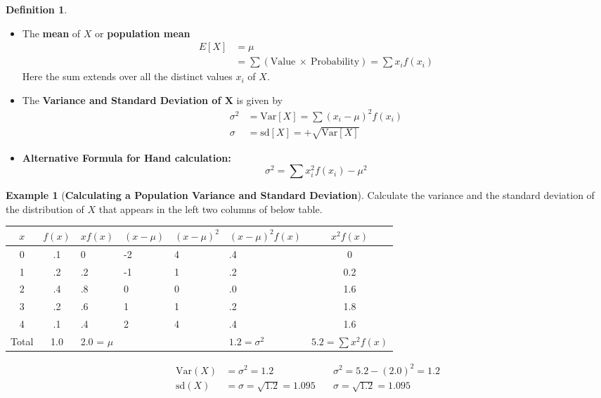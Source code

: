 \documentclass[12pt,openany]{book}
\theoremstyle{definition}
\newtheorem{definition}{Definition}[chapter]
\newtheorem{example}{Example}[chapter]
\newcommand{\Var}{\text{Var}}
\newcommand{\sd}{\text{sd}}
\begin{document}
	\vspace{10pt}
	\begin{tcolorbox}[colback=white,colframe=defcolor,arc=5pt,title={\color{white}\bf Expectation(Mean) and Standard Deviation of a Probability Distribution}]
		\begin{definition}
			\ \begin{itemize}
				\item The \textbf{mean} of $X$ or \textbf{population mean} \begin{align*}
					E[X] &= \mu \\
					&= \sum(\text{Value}\ \times\ \text{Probability})=\sum x_if(x_i)
				\end{align*} Here the sum extends over all the distinct values $x_i$ of $X$.
				\item The \textbf{Variance and Standard Deviation of $\boldsymbol{X}$}
			 is given by \begin{align*}
			\sigma^2 &=\Var[X]=\sum(x_i-\mu)^2f(x_i) \\
			\sigma &=\sd[X]= +\sqrt{\Var[X]}
		\end{align*}
				\item \textbf{Alternative Formula for Hand calculation:} \[
				\sigma^2=\sum x_i^2f(x_i) - \mu^2
				\]
			\end{itemize}
		\end{definition}
	\end{tcolorbox}
	\vspace{10pt}
	\begin{example}[\bf Calculating a Population Variance and Standard Deviation]
		Calculate the variance and the standard deviation of the distribution of $X$ that appears in the left two columns of below table.
		\begin{center}\renewcommand*{\arraystretch}{1.4}\begin{tabularx}{\textwidth}{c|c||XXXX||c}
				\toprule[1.2pt]
				$x$ & $f(x)$ & $xf(x)$ & $(x-\mu)$ & $(x-\mu)^2$ & $(x-\mu)^2f(x)$ & $x^2f(x)$\\
				\hline
				0&.1& 0 & -2&4&.4&0\\
				1&.2& .2& -1&1&.2&0.2\\
				2&.4& .8& 0&0&.0&1.6\\
				3&.2& .6& 1&1&.2&1.8\\
				4&.1& .4& 2&4&.4&1.6\\
				\hline
				Total&1.0&2.0 = $\mu$&&&$1.2=\sigma^2$&$5.2=\sum x^2f(x)$\\
			\end{tabularx}
		\end{center}\begin{align*}
			\Var(X)&=\sigma^2=1.2\quad& \sigma^2=5.2-(2.0)^2=1.2 \\
			\sd(X)&=\sigma=\sqrt{1.2}=1.095\quad& \sigma=\sqrt{1.2}=1.095
		\end{align*}
	\end{example}
	
\end{document}
